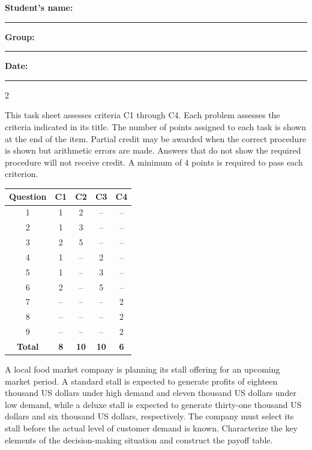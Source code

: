 	\vspace{0.1cm}
	\noindent
	\textbf{Student's name:} \rule{7cm}{0.4pt}\hfill
	\textbf{Group:} \rule{2cm}{0.4pt}\hfill
	\textbf{Date:} \rule{3cm}{0.4pt}
	
	\vspace{-2mm}
	\begin{multicols}{2}
		
		This task sheet assesses criteria C1 through C4. Each problem assesses the criteria indicated in its title. The number of points assigned to each task is shown at the end of the item. Partial credit may be awarded when the correct procedure is shown but arithmetic errors are made. Answers that do not show the required procedure will not receive credit. A minimum of 4 points is required to pass each criterion.
		\begin{center}
			\begin{tabular}{|c|c|c|c|c|}
				\hline
				\textbf{Question} & \textbf{C1} & \textbf{C2} & \textbf{C3} & \textbf{C4} \\ \hline
				1 & 1 & 2 & -- & -- \\ \hline
				2 & 1 & 3 & -- & -- \\ \hline
				3 & 2 & 5 & -- & -- \\ \hline
				4 & 1 & -- & 2 & -- \\ \hline
				5 & 1 & -- & 3 & -- \\ \hline
				6 & 2 & -- & 5 & -- \\ \hline
				7 & -- & -- & -- & 2 \\ \hline
				8 & -- & -- & -- & 2 \\ \hline
				9 & -- & -- & -- & 2 \\ \hline
				\textbf{Total} & \textbf{8} & \textbf{10} & \textbf{10} & \textbf{6} \\ \hline
			\end{tabular}
		\end{center}
		\vspace*{2cm}
		
		\columnbreak
		
		A local food market company is planning its stall offering for an upcoming market period. A standard stall is expected to generate profits of eighteen thousand US dollars under high demand and eleven thousand US dollars under low demand, while a deluxe stall is expected to generate thirty-one thousand US dollars and six thousand US dollars, respectively. The company must select its stall before the actual level of customer demand is known. Characterize the key elements of the decision-making situation and construct the payoff table.
		

\end{multicols}

